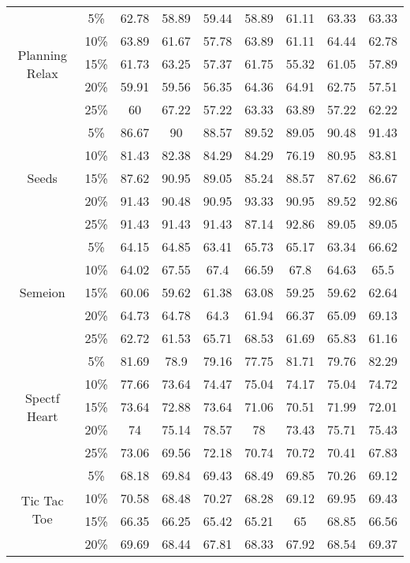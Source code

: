 \begin{longtable}[c]{|c|c|c|c|c|c|c|c|c|}
\multirow{5}{*}{Planning Relax}
& 5\% & 62.78 & 58.89 & 59.44 & 58.89 & 61.11 & 63.33 & 63.33 \\ 
& 10\% & 63.89 & 61.67 & 57.78 & 63.89 & 61.11 & 64.44 & 62.78 \\
& 15\% & 61.73 & 63.25 & 57.37 & 61.75 & 55.32 & 61.05 & 57.89 \\
& 20\% & 59.91 & 59.56 & 56.35 & 64.36 & 64.91 & 62.75 & 57.51 \\
& 25\% & 60 & 67.22 & 57.22 & 63.33 & 63.89 & 57.22 & 62.22 \\ \hline
\multirow{5}{*}{Seeds}
& 5\% & 86.67 & 90 & 88.57 & 89.52 & 89.05 & 90.48 & 91.43 \\ 
& 10\% & 81.43 & 82.38 & 84.29 & 84.29 & 76.19 & 80.95 & 83.81 \\
& 15\% & 87.62 & 90.95 & 89.05 & 85.24 & 88.57 & 87.62 & 86.67 \\
& 20\% & 91.43 & 90.48 & 90.95 & 93.33 & 90.95 & 89.52 & 92.86 \\
& 25\% & 91.43 & 91.43 & 91.43 & 87.14 & 92.86 & 89.05 & 89.05 \\ \hline
\multirow{5}{*}{Semeion}
& 5\% & 64.15 & 64.85 & 63.41 & 65.73 & 65.17 & 63.34 & 66.62 \\ 
& 10\% & 64.02 & 67.55 & 67.4 & 66.59 & 67.8 & 64.63 & 65.5 \\
& 15\% & 60.06 & 59.62 & 61.38 & 63.08 & 59.25 & 59.62 & 62.64 \\
& 20\% & 64.73 & 64.78 & 64.3 & 61.94 & 66.37 & 65.09 & 69.13 \\
& 25\% & 62.72 & 61.53 & 65.71 & 68.53 & 61.69 & 65.83 & 61.16 \\ \hline
\multirow{5}{*}{Spectf Heart}
& 5\% & 81.69 & 78.9 & 79.16 & 77.75 & 81.71 & 79.76 & 82.29 \\ 
& 10\% & 77.66 & 73.64 & 74.47 & 75.04 & 74.17 & 75.04 & 74.72 \\
& 15\% & 73.64 & 72.88 & 73.64 & 71.06 & 70.51 & 71.99 & 72.01 \\
& 20\% & 74 & 75.14 & 78.57 & 78 & 73.43 & 75.71 & 75.43 \\
& 25\% & 73.06 & 69.56 & 72.18 & 70.74 & 70.72 & 70.41 & 67.83 \\ \hline
\multirow{5}{*}{Tic Tac Toe}
& 5\% & 68.18 & 69.84 & 69.43 & 68.49 & 69.85 & 70.26 & 69.12 \\ 
& 10\% & 70.58 & 68.48 & 70.27 & 68.28 & 69.12 & 69.95 & 69.43 \\
& 15\% & 66.35 & 66.25 & 65.42 & 65.21 & 65 & 68.85 & 66.56 \\
& 20\% & 69.69 & 68.44 & 67.81 & 68.33 & 67.92 & 68.54 & 69.37 \\

\end{longtable}
